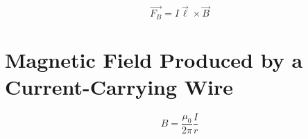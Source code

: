 		\begin{mdframed}[backgroundcolor=orange!20!white]
		\begin{equation}
			\overrightarrow{F_B} = I \vec{\ell} \times \vec{B}
			\label{eqn:magforcewire}
		\end{equation}
	\end{mdframed}

	
	\section{Magnetic Field Produced by a Current-Carrying Wire}
	
		\begin{mdframed}[backgroundcolor=orange!20!white]
		\begin{equation}
			B = \frac{\mu_0}{2\pi}\frac{I}{r}
			\label{eqn:magfieldwire}
		\end{equation}
	\end{mdframed}
	

		
	
	
	

	


